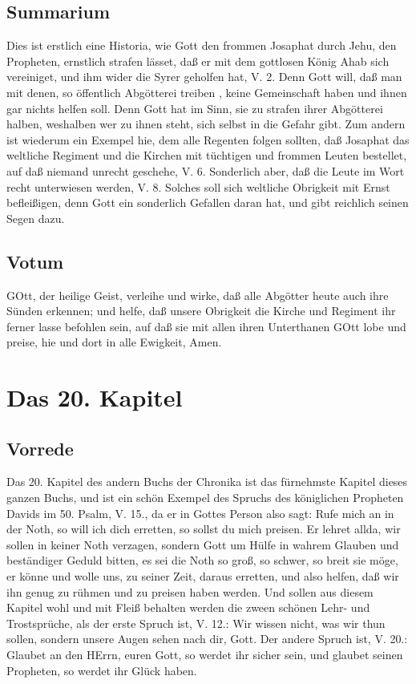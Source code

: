 \section{Summarium}

Dies ist erstlich eine Historia, wie Gott den frommen Josaphat durch Jehu, den Propheten, ernstlich strafen lässet, daß er mit dem gottlosen König Ahab sich vereiniget, und ihm wider die Syrer geholfen hat, V. 2. Denn Gott will, daß man mit denen, so öffentlich Abgötterei treiben
, keine Gemeinschaft haben und ihnen gar nichts helfen soll. Denn Gott hat im Sinn, sie zu strafen ihrer Abgötterei halben, weshalben wer zu ihnen steht, sich selbst in die Gefahr gibt. Zum andern ist wiederum ein Exempel hie, dem alle Regenten folgen sollten, daß Josaphat das weltliche Regiment und die Kirchen mit tüchtigen und frommen Leuten bestellet, auf daß niemand unrecht geschehe, V. 6. Sonderlich aber, daß die Leute im Wort recht unterwiesen werden, V. 8. Solches soll sich weltliche Obrigkeit mit Ernst befleißigen, denn Gott ein sonderlich Gefallen daran hat, und gibt reichlich seinen Segen dazu.

\section{Votum}

GOtt, der heilige Geist, verleihe und wirke, daß alle Abgötter heute auch ihre Sünden erkennen; und helfe, daß unsere Obrigkeit die Kirche und Regiment ihr ferner lasse befohlen sein, auf daß sie mit allen ihren Unterthanen GOtt lobe und preise, hie und dort in alle Ewigkeit, Amen.

\chapter{Das 20. Kapitel}

\section{Vorrede}

Das 20. Kapitel des andern Buchs der Chronika ist das fürnehmste Kapitel dieses ganzen Buchs, und ist ein schön Exempel des Spruchs des königlichen Propheten Davids im 50. Psalm, V. 15., da er in Gottes Person also sagt: Rufe mich an in der Noth, so will ich dich erretten, so sollst du mich preisen. Er lehret allda, wir sollen in keiner Noth verzagen, sondern Gott um Hülfe in wahrem Glauben und beständiger Geduld bitten, es sei die Noth so groß, so schwer, so breit sie möge, er könne und wolle uns, zu seiner Zeit, daraus erretten, und also helfen, daß wir ihn genug zu rühmen und zu preisen haben werden. Und sollen aus diesem Kapitel wohl und mit Fleiß behalten werden die zween schönen Lehr- und Trostsprüche, als der erste Spruch ist, V. 12.: Wir wissen nicht, was wir thun sollen, sondern unsere Augen sehen nach dir, Gott. Der andere Spruch ist, V. 20.: Glaubet an den HErrn, euren Gott, so werdet ihr sicher sein, und glaubet seinen Propheten, so werdet ihr Glück haben.

